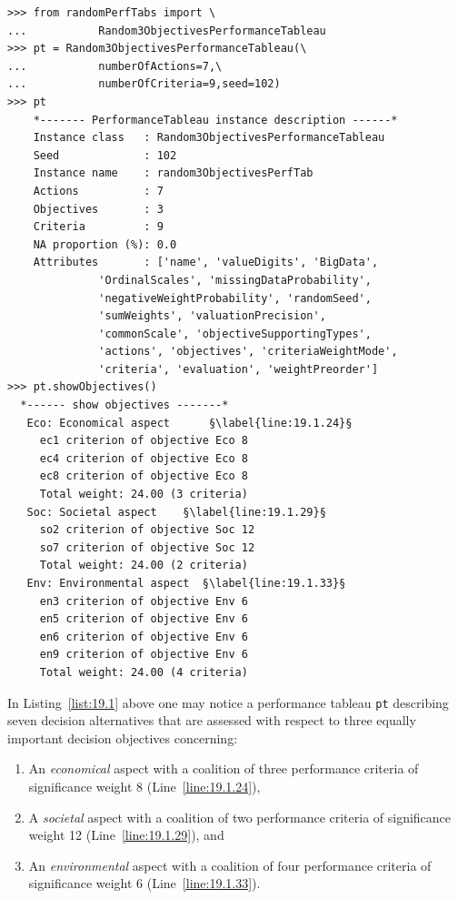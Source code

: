\begin{lstlisting}[caption={Generate a Random 3 Objectives Performance Tableau},label=list:19.1]
>>> from randomPerfTabs import \
...           Random3ObjectivesPerformanceTableau
>>> pt = Random3ObjectivesPerformanceTableau(\
...           numberOfActions=7,\
...           numberOfCriteria=9,seed=102)
>>> pt
    *------- PerformanceTableau instance description ------*
    Instance class   : Random3ObjectivesPerformanceTableau
    Seed             : 102
    Instance name    : random3ObjectivesPerfTab
    Actions          : 7
    Objectives       : 3
    Criteria         : 9
    NA proportion (%): 0.0
    Attributes       : ['name', 'valueDigits', 'BigData',
              'OrdinalScales', 'missingDataProbability',
              'negativeWeightProbability', 'randomSeed',
              'sumWeights', 'valuationPrecision',
              'commonScale', 'objectiveSupportingTypes',
              'actions', 'objectives', 'criteriaWeightMode',
              'criteria', 'evaluation', 'weightPreorder']
>>> pt.showObjectives()
  *------ show objectives -------*
   Eco: Economical aspect      §\label{line:19.1.24}§
     ec1 criterion of objective Eco 8
     ec4 criterion of objective Eco 8
     ec8 criterion of objective Eco 8
     Total weight: 24.00 (3 criteria)
   Soc: Societal aspect    §\label{line:19.1.29}§
     so2 criterion of objective Soc 12
     so7 criterion of objective Soc 12
     Total weight: 24.00 (2 criteria)
   Env: Environmental aspect  §\label{line:19.1.33}§
     en3 criterion of objective Env 6
     en5 criterion of objective Env 6
     en6 criterion of objective Env 6
     en9 criterion of objective Env 6
     Total weight: 24.00 (4 criteria)
\end{lstlisting}

In Listing~\ref{list:19.1} above one may notice a performance tableau \texttt{pt} describing seven decision alternatives that are assessed with respect to three equally important decision objectives concerning:
\begin{enumerate}[topsep=1pt]
\item An \emph{economical} aspect with a coalition of three performance criteria of significance weight 8 (Line~\ref{line:19.1.24}),
\item A \emph{societal} aspect with a coalition of two performance criteria of significance weight 12 (Line~\ref{line:19.1.29}), and
\item An \emph{environmental} aspect with a coalition of four performance criteria of significance weight 6 (Line~\ref{line:19.1.33}).
\end{enumerate}

